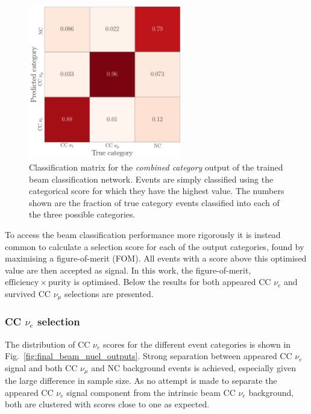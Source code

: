 \begin{figure} %
    \includegraphics[width=0.6\textwidth]{diagrams/6-cvn/chipsnet/final_comb_cat_confusion.pdf}
    \caption[Classification matrix for the combined category output of the beam classification
        network.] {Classification matrix for the \emph{combined category} output of the trained
        beam classification network. Events are simply classified using the categorical score for
        which they have the highest value. The numbers shown are the fraction of true category
        events classified into each of the three possible categories.}
    \label{fig:final_comb_cat_confusion}
\end{figure}

To access the beam classification performance more rigorously it is instead common to calculate a
selection score for each of the output categories, found by maximising a figure-of-merit (FOM).
All events with a score above this optimised value are then accepted as signal. In this work, the
figure-of-merit, $\mathrm{efficiency}\times\mathrm{purity}$ is optimised. Below the results for
both appeared CC $\nu_{e}$ and survived CC $\nu_{\mu}$ selections are presented.

\subsubsection*{CC $\nu_{e}$ selection} %

The distribution of CC $\nu_{e}$ scores for the different event categories is shown in
Fig.~\ref{fig:final_beam_nuel_outputs}. Strong separation between appeared CC $\nu_{e}$ signal and
both CC $\nu_{\mu}$ and NC background events is achieved, especially given the large difference in
sample size. As no attempt is made to separate the appeared CC $\nu_{e}$ signal component from the
intrinsic beam CC $\nu_{e}$ background, both are clustered with scores close to one as expected.

